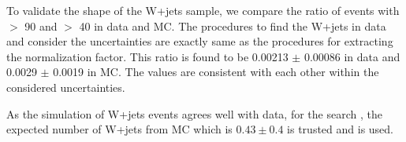 To validate the shape of the W+jets sample, we compare the ratio of events with \mttwo $>$ 90 \GeV and  \mttwo $>$ 40 \GeV in data and MC.
The procedures to find the W+jets in data and consider the uncertainties are exactly same as the procedures for extracting the normalization  
factor. This ratio is found to be 0.00213 $\pm$ 0.00086 in data and  0.0029 $\pm$ 0.0019 in MC. The values are consistent with each other within 
the considered uncertainties.

As the simulation of W+jets events agrees well with data, for the search \bintwo, the expected number of W+jets from MC which is $0.43\pm0.4$ is trusted and is used.

